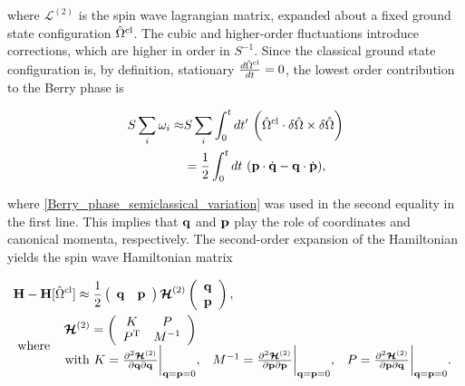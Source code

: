 \documentclass{homework}
\begin{document}
where $ \bm{\mathcal{L}}^{(2)}$ is the spin wave lagrangian matrix, expanded about a fixed ground state configuration $\hat{\Omega}^{\textnormal{cl}}$. The cubic and higher-order fluctuations introduce corrections, which are higher in order in $S^{-1}$. Since the classical ground state configuration is, by definition, stationary $\frac{d \hat{\Omega}^{\textnormal{cl}}}{dt} = 0$, the lowest order contribution to the Berry phase is 

\begin{equation}
\begin{split}
    S \sum_{i}\omega_i \approx& S \sum_{i} \int_{0}^{t} dt' \textnormal{ } \bigg(\hat{\Omega}^{\textnormal{cl}} \cdot \delta\hat{\Omega} \times \delta \hat{\Omega} \bigg) \\
    &= \frac{1}{2} \int_{0}^{t} dt \textnormal{ } ({\bf p} \cdot \dot{{\bf q}} - {\bf q} \cdot \dot{{\bf p}}),
\end{split}
\end{equation}

where \cref{Berry_phase_semiclassical_variation} was used in the second equality in the first line. This implies that ${\bf q}$ and ${\bf p}$ play the role of coordinates and canonical momenta, respectively. The second-order expansion of the Hamiltonian yields the spin wave Hamiltonian matrix 

\begin{equation}
    \begin{split}
        &{\bf H} - {\bf H}[\hat{\Omega}^{\textnormal{cl}}] \approx \frac{1}{2} \left(\begin{array}{cc}
          {\bf q} & {\bf p}
    \end{array}\right) \bm{\mathcal{H}}^{(2)} \left( \begin{array}{c}
          {\bf q} \\
          {\bf p}
    \end{array}\right), \\
    &\textnormal{ where } \begin{array}{ccc}
         \bm{\mathcal{H}}^{(2)} = \left(\begin{array}{cc}
         K & P  \\
         P^{\textnormal{T}} & M^{-1} 
    \end{array}\right) \\
         \textnormal{ with } K = \frac{\partial^2 \bm{\mathcal{H}}^{(2)}}{\partial {\bf q} \partial {\bf q}}\bigg|_{{\bf q} = {\bf p} = 0}, & 
         M^{-1} = \frac{\partial^2 \bm{\mathcal{H}}^{(2)}}{\partial {\bf p} \partial {\bf p}}\bigg|_{{\bf q} = {\bf p} = 0}, & 
         P = \frac{\partial^2 \bm{\mathcal{H}}^{(2)}}{\partial {\bf p} \partial {\bf q}}\bigg|_{{\bf q} = {\bf p} = 0}.
    \end{array}
    \end{split}
    \label{spin_wave_path_integral_quadratic_form_matrix_form}
\end{equation}
\end{document}

